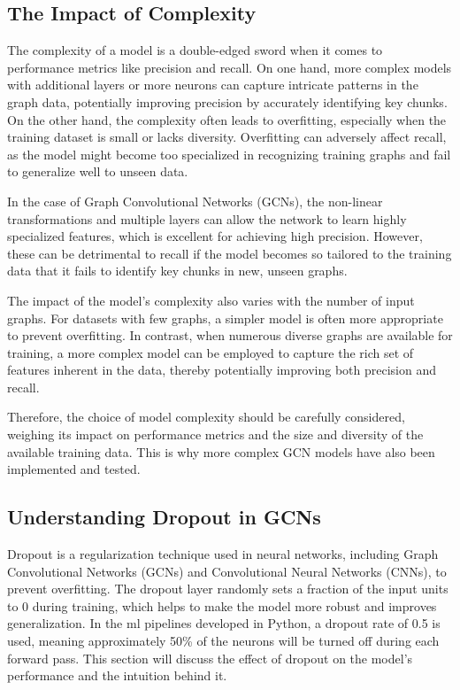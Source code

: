 \subsection{The Impact of Complexity}

The complexity of a model is a double-edged sword when it comes to performance metrics like precision and recall. On one hand, more complex models with additional layers or more neurons can capture intricate patterns in the graph data, potentially improving precision by accurately identifying key chunks. On the other hand, the complexity often leads to overfitting, especially when the training dataset is small or lacks diversity. Overfitting can adversely affect recall, as the model might become too specialized in recognizing training graphs and fail to generalize well to unseen data.

In the case of Graph Convolutional Networks (GCNs), the non-linear transformations and multiple layers can allow the network to learn highly specialized features, which is excellent for achieving high precision. However, these can be detrimental to recall if the model becomes so tailored to the training data that it fails to identify key chunks in new, unseen graphs.

The impact of the model's complexity also varies with the number of input graphs. For datasets with few graphs, a simpler model is often more appropriate to prevent overfitting. In contrast, when numerous diverse graphs are available for training, a more complex model can be employed to capture the rich set of features inherent in the data, thereby potentially improving both precision and recall.

Therefore, the choice of model complexity should be carefully considered, weighing its impact on performance metrics and the size and diversity of the available training data. This is why more complex GCN models have also been implemented and tested.

\subsection{Understanding Dropout in GCNs}

Dropout is a regularization technique used in neural networks, including Graph Convolutional Networks (GCNs) and Convolutional Neural Networks (CNNs), to prevent overfitting. The dropout layer randomly sets a fraction of the input units to 0 during training, which helps to make the model more robust and improves generalization. In the \acrshort{ml} pipelines developed in Python, a dropout rate of 0.5 is used, meaning approximately 50\% of the neurons will be turned off during each forward pass. This section will discuss the effect of dropout on the model's performance and the intuition behind it.


